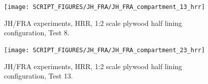 
\begin{figure}[h!]
\centering
\texttt{[image: SCRIPT\_FIGURES/JH\_FRA/JH\_FRA\_compartment\_13\_hrr]}
\caption[JH/FRA experiments, HRR, 1:2 scale plywood half lining configuration, Test 8]{JH/FRA experiments, HRR, 1:2 scale plywood half lining configuration, Test 8.}
\label{JH_FRA_plywood_02}
\end{figure}


\begin{figure}[h!]
\centering
\texttt{[image: SCRIPT\_FIGURES/JH\_FRA/JH\_FRA\_compartment\_23\_hrr]}
\caption[JH/FRA experiments, HRR, 1:1 scale plywood half lining configuration, Test 13]{JH/FRA experiments, HRR, 1:2 scale plywood half lining configuration, Test 13.}
\label{JH_FRA_plywood_03}
\end{figure}


